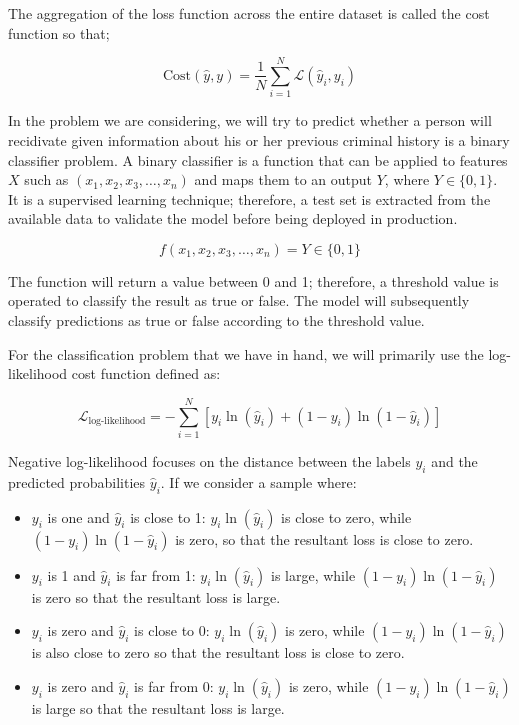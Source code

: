 		\bigskip
		
		The aggregation of the loss function across the entire dataset is called the cost function so that;
		
		$$
		\text{Cost}(\hat{y}, y) = \frac{1}{N}\sum_{i=1}^{N} \mathcal{L}(\widehat{y}_i, y_i)
		$$
		
		In the problem we are considering, we will try to predict whether a person will recidivate given information about his or her previous criminal history is a binary classifier problem. A binary classifier is a function that can be applied to features $X$ such as $(x_1, x_2, x_3, \dots, x_n)$ and maps them to an output $Y$, where $Y \in \{0, 1\}$. It is a supervised learning technique; therefore, a test set is extracted from the available data to validate the model before being deployed in production.
		
		$$ f(x_1, x_2, x_3, \dots, x_n) = Y \in \{0, 1\}  $$
		
		The function will return a value between 0 and 1; therefore, a threshold value is operated to classify the result as true or false. The model will subsequently classify predictions as true or false according to the threshold value.
		
		
		For the classification problem that we have in hand, we will  primarily use the log-likelihood  cost function defined as:
		
		$$\mathcal{L}_{\text{log-likelihood}} = - \sum_{i=1}^N \left[ y_i \ln(\hat{y}_i) + (1 - y_i) \ln(1 - \hat{y}_i) \right]$$
		
		Negative log-likelihood focuses on the distance between the labels $y_i$ and the predicted probabilities $\hat{y}_i$. If we consider a sample where:
		
		\begin{itemize}
			\item $y_i$ is one and $\hat{y}_i$ is close to 1: $y_i \ln(\hat{y}_i)$ is close to zero, while $(1 - y_i) \ln(1 - \hat{y}_i)$ is zero, so that the resultant loss is close to zero.
			\item $y_i$ is 1 and $\hat{y}_i$ is far from 1: $y_i \ln(\hat{y}_i)$ is large, while $(1 - y_i) \ln(1 - \hat{y}_i)$ is zero so that the resultant loss is large.
			\item $y_i$ is zero and $\hat{y}_i$ is close to 0: $y_i \ln(\hat{y}_i)$ is zero, while $(1 - y_i) \ln(1 - \hat{y}_i)$ is also close to zero so that the resultant loss is close to zero.
			\item $y_i$ is zero and $\hat{y}_i$ is far from 0: $y_i \ln(\hat{y}_i)$ is zero, while $(1 - y_i) \ln(1 - \hat{y}_i)$ is large so that the resultant loss is large.
		\end{itemize}
		\bigskip
		

